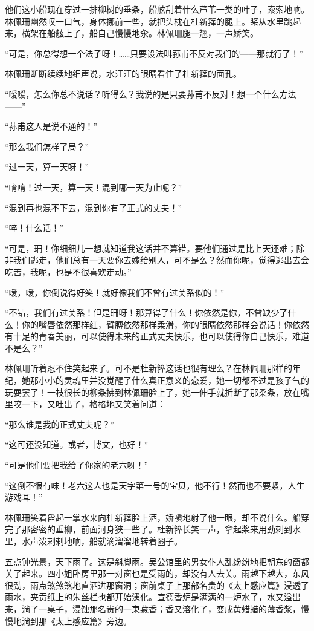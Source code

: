 \par 他们这小船现在穿过一排柳树的垂条，船舷刮着什么芦苇一类的叶子，索索地响。林佩珊幽然叹一口气，身体挪前一些，就把头枕在杜新箨的腿上。桨从水里跳起来，横架在船舷上了，船自己慢慢地汆。林佩珊腿一翘，一声娇笑。
\par “可是，你总得想一个法子呀！……只要设法叫荪甫不反对我们的——那就行了！”
\par 林佩珊断断续续地细声说，水汪汪的眼睛看住了杜新箨的面孔。
\par “嗳嗳，怎么你总不说话？听得么？我说的是只要荪甫不反对！想一个什么方法——”
\par “荪甫这人是说不通的！”
\par “那么我们怎样了局？”
\par “过一天，算一天呀！”
\par “唷唷！过一天，算一天！混到哪一天为止呢？”
\par “混到再也混不下去，混到你有了正式的丈夫！”
\par “啐！什么话！”
\par “可是，珊！你细细儿一想就知道我这话并不算错。要他们通过是比上天还难；除非我们逃走，他们总有一天要你去嫁给别人，可不是么？然而你呢，觉得逃出去会吃苦，我呢，也是不很喜欢走动。”
\par “嗳，嗳，你倒说得好笑！就好像我们不曾有过关系似的！”
\par “不错，我们有过关系！但是珊呀！那算得了什么！你依然是你，不曾缺少了什么！你的嘴唇依然那样红，臂膊依然那样柔滑，你的眼睛依然那样会说话！你依然有十足的青春美丽，可以使得未来的正式丈夫快乐，也可以使得你自己快乐，难道不是么？”
\par 林佩珊听着忍不住笑起来了。可不是杜新箨这话也很有理么？在林佩珊那样的年纪，她那小小的灵魂里并没觉醒了什么真正意义的恋爱，她一切都不过是孩子气的玩耍罢了！一枝很长的柳条拂到林佩珊脸上了，她一伸手就折断了那柔条，放在嘴里咬一下，又吐出了，格格地又笑着问道：
\par “那么谁是我的正式丈夫呢？”
\par “这可还没知道。或者，博文，也好！”
\par “可是他们要把我给了你家的老六呀！”
\par “这倒不很有味！老六这人也是天字第一号的宝贝，他不行！然而也不要紧，人生游戏耳！”
\par 林佩珊笑着舀起一掌水来向杜新箨脸上洒，娇嗔地射了他一眼，却不说什么。船穿完了那密密的垂柳，前面河身狭一些了。杜新箨长笑一声，拿起桨来用劲刺到水里，水声泼剌剌地响，船就滴溜溜地转着圈子。
\par 五点钟光景，天下雨了。这是斜脚雨。吴公馆里的男女仆人乱纷纷地把朝东的窗都关了起来。四小姐卧房里那一对窗也是受雨的，却没有人去关。雨越下越大，东风很劲，雨点煞煞煞地直洒进那窗洞；窗前桌子上那部名贵的《太上感应篇》浸透了雨水，夹贡纸上的朱丝栏也都开始漶化。宣德香炉是满满的一炉水了，水又溢出来，淌了一桌子，浸蚀那名贵的一束藏香；香又溶化了，变成黄蜡蜡的薄香浆，慢慢地淌到那《太上感应篇》旁边。
